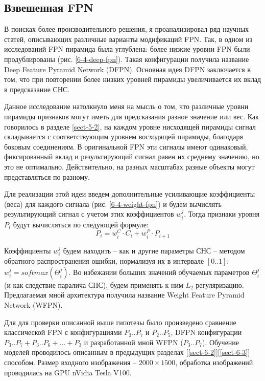 \subsection{Взвешенная FPN}

В поисках более производительного решения, я проанализировал ряд научных статей, описывающих различные варианты модификаций FPN. Так, в одном из исследований \cite{lib-dfpn} FPN пирамида была углублена: более низкие уровни FPN были продублированы (рис. \ref{6-4-deep-fpn}). Такая конфигурации получила название Deep Feature Pyramid Network (DFPN). Основная идея DFPN заключается в том, что при повторении более низких уровней пирамиды увеличивается их вклад в предсказание СНС.


Данное исследование натолкнуло меня на мысль о том, что различные уровни пирамиды признаков могут иметь для предсказания разное значение или вес. Как говорилось в разделе \ref{sect-5-2}, на каждом уровне нисходящей пирамиды сигнал складывается с соответствующим уровнем восходящей пирамиды, благодаря боковым соединениям. В оригинальной FPN эти сигналы имеют одинаковый, фиксированный вклад и результирующий сигнал равен их среднему значению, но это не оптимально. Действительно, на разных масштабах разные объекты могут представляться по разному. 

Для реализации этой идеи введем дополнительные усиливающие коэффициенты (веса) для каждого сигнала (рис. \ref{6-4-weight-fpn}) и будем вычислять результирующий сигнал с учетом этих коэффициентов $w^{j}_{i}$. Тогда признаки уровня $P_i$ будут вычисляться по следующей формуле:
$$
P_i = w^{C}_i \cdot C_i + w^{P}_i \cdot P_{i+1}
$$

Коэффициенты $w^{j}_{i}$ будем находить -- как и другие параметры СНС -- методом обратного распространения ошибки, нормализуя их в интервале $[0..1]$: $w^{j}_{i} = softmax(\Theta^{j}_{i})$. Во избежании больших значений обучаемых параметров $\Theta^{j}_{i}$ (и как следствие паралича СНС), будем применять к ним $L_2$ регуляризацию. Предлагаемая мной архитектура получила название Weight Feature Pyramid Network (WFPN).


Для для проверки описанной выше гипотезы было произведено сравнение классической FPN с конфигурациями $P_3..P_7$ и $P_2..P_5$, DFPN конфигурации $P_3..P_7 + P_3..P_6 + ... + P_3$ и разработанной мной WFPN ($P_3..P_7$). Обучение моделей проводилось описанным в предыдущих разделах [\ref{sect-6-2}][\ref{sect-6-3}] способом. Размер входного изображения -- $2000\times1500$, обработка изображений проводилась на GPU nVidia Tesla V100.

